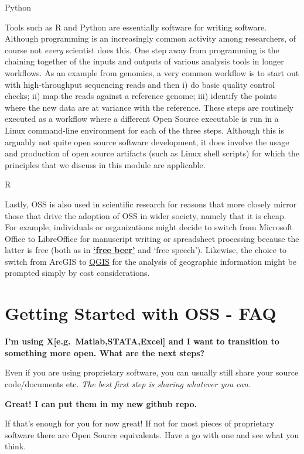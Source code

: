 \documentclass[]{book}
\begin{document}
{{{{{{{{{{{{{{Python

Tools such as R and Python are essentially software for writing software. Although programming is an increasingly common activity among researchers, of course not \emph{every} scientist does this. One step away from programming is the chaining together of the inputs and outputs of various analysis tools in longer workflows. As an example from genomics, a very common workflow is to start out with high-throughput sequencing reads and then i) do basic quality control checks; ii) map the reads against a reference genome; iii) identify the points where the new data are at variance with the reference. These steps are routinely executed as a workflow where a different Open Source executable is run in a Linux command-line environment for each of the three steps. Although this is arguably not quite open source software development, it does involve the usage and production of open source artifacts (such as Linux shell scripts) for which the principles that we discuss in this module are applicable.

R

Lastly, OSS is also used in scientific research for reasons that more closely mirror those that drive the adoption of OSS in wider society, namely that it is cheap. For example, individuals or organizations might decide to switch from Microsoft Office to LibreOffice for manuscript writing or spreadsheet processing because the latter is free (both as in \href{https://www.youtube.com/watch?v=dQw4w9WgXcQ}{\textbf{`free beer'}} and `free speech'). Likewise, the choice to switch from ArcGIS to \href{https://www.qgis.org/en/site/}{QGIS} for the analysis of geographic information might be prompted simply by cost considerations.

\hypertarget{getting-started-with-oss---faq}{%
\section{Getting Started with OSS - FAQ }\label{getting-started-with-oss---faq}}

\textbf{I'm using X{[}e.g.~Matlab,STATA,Excel{]} and I want to transition to something more open. What are the next steps?}

Even if you are using proprietary software, you can usually still share your source code/documents etc. \emph{The best first step is sharing whatever you can}.

\textbf{Great! I can put them in my new github repo.}

If that's enough for you for now great! If not for most pieces of proprietary software there are Open Source equivalents. Have a go with one and see what you think.

}}}}}}}}}}}}}}
\end{document}
